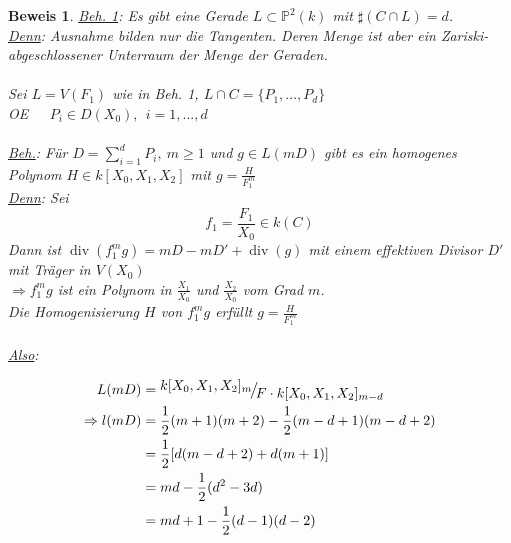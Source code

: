 \documentclass[a4paper,12pt]{report}
\theoremstyle{break}
\theoremstyle{nonumberbreak}
\theoremstyle{nonumberplain}
\newtheorem{Bew}{Beweis}
\newcommand{\FakRaum}[2]{
  \raisebox{0.7ex}{\ensuremath{#1}}
  \ensuremath{\mkern-3mu}\big/\ensuremath{\mkern-3mu}
  \raisebox{-0.6ex}{\ensuremath{#2}}}
\renewcommand{\OE}{O\!\!E~}
\begin{document}
\begin{Bew}
\underline{Beh. 1}: Es gibt eine Gerade $L\subset\mathbb{P}^2(k)$ mit $\sharp(C\cap L)=d$.\\
\underline{Denn}: Ausnahme bilden nur die Tangenten. Deren Menge ist aber ein Zariski-abgeschlossener Unterraum der Menge der Geraden.\\
\\
Sei $L=V(F_1)$ wie in Beh. 1, $L\cap C=\{P_1,...,P_d\}$\\
\OE~~$P_i\in D(X_0),~~i=1,...,d$\\
\\
\underline{Beh.}: Für $D=\sum_{i=1}^dP_i,~m\geq 1$ und $g\in L(mD)$ gibt es ein homogenes Polynom $H\in k[X_0,X_1,X_2]$ mit $g=\frac{H}{F_1^m}$\\
\underline{Denn}: Sei 
$$f_1=\frac{F_1}{X_0}\in k(C)$$
Dann ist $\operatorname{div}(f_1^mg)=mD-mD'+\operatorname{div}(g)$ mit einem effektiven Divisor $D'$
mit Träger in $V(X_0)$\\
$\Rightarrow f_1^mg$ ist ein Polynom in $\frac{X_1}{X_0}$ und $\frac{X_2}{X_0}$ vom Grad $m$.\\
Die Homogenisierung $H$ von $f_1^mg$ erfüllt $g=\frac{H}{F_1^m}$\\
\\
\underline{Also}: 

\begin{align*}
L(mD)&=\FakRaum{k[X_0,X_1,X_2]_m}{F\cdot k[X_0,X_1,X_2]_{m-d}}\\
\Rightarrow l(mD)&=\frac{1}{2}(m+1)(m+2)-\frac{1}{2}(m-d+1)(m-d+2)\\
&=\frac{1}{2}[d(m-d+2)+d(m+1)]\\
&=md-\frac{1}{2}(d^2-3d)\\
&=md+1-\frac{1}{2}(d-1)(d-2)
\end{align*}

\end{Bew}
\end{document}
